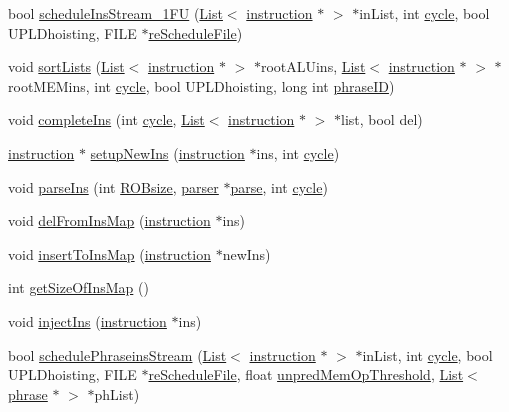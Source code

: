 \begin{DoxyCompactItemize}
\item 
bool \hyperlink{classvliwScheduler_aab01a955d85779eeeddb36cf921e8e80}{scheduleInsStream\_\-1FU} (\hyperlink{classList}{List}$<$ \hyperlink{classinstruction}{instruction} $\ast$ $>$ $\ast$inList, int \hyperlink{vliwScheduler_8cpp_a1f4871d45089b039d95d3832dd123827}{cycle}, bool UPLDhoisting, FILE $\ast$\hyperlink{bkEnd_8cpp_a0e5f51d6a6b1d82437b223b600c984c2}{reScheduleFile})
\item 
void \hyperlink{classvliwScheduler_aa7078d3900e7edcb82304e988339d33a}{sortLists} (\hyperlink{classList}{List}$<$ \hyperlink{classinstruction}{instruction} $\ast$ $>$ $\ast$rootALUins, \hyperlink{classList}{List}$<$ \hyperlink{classinstruction}{instruction} $\ast$ $>$ $\ast$rootMEMins, int \hyperlink{vliwScheduler_8cpp_a1f4871d45089b039d95d3832dd123827}{cycle}, bool UPLDhoisting, long int \hyperlink{bkEnd_8cpp_a3709ef01c299a1b84a1b023b9a44d4bc}{phraseID})
\item 
void \hyperlink{classvliwScheduler_aae6254bfac1e348447643a0dec8cbf03}{completeIns} (int \hyperlink{vliwScheduler_8cpp_a1f4871d45089b039d95d3832dd123827}{cycle}, \hyperlink{classList}{List}$<$ \hyperlink{classinstruction}{instruction} $\ast$ $>$ $\ast$list, bool del)
\item 
\hyperlink{classinstruction}{instruction} $\ast$ \hyperlink{classvliwScheduler_afd1ec0df4e12e892ef2e1d6cd5a1ad3c}{setupNewIns} (\hyperlink{classinstruction}{instruction} $\ast$ins, int \hyperlink{vliwScheduler_8cpp_a1f4871d45089b039d95d3832dd123827}{cycle})
\item 
void \hyperlink{classvliwScheduler_a9fde0b92fb06b843f278907413661df1}{parseIns} (int \hyperlink{bkEnd_8cpp_a06a6e046fd7b9a66b03d334b1df5e3ad}{ROBsize}, \hyperlink{classparser}{parser} $\ast$\hyperlink{bkEnd_8cpp_a9b8e7669bda57879d8abc5234b2f0b19}{parse}, int \hyperlink{vliwScheduler_8cpp_a1f4871d45089b039d95d3832dd123827}{cycle})
\item 
void \hyperlink{classvliwScheduler_ae3dceea059708a0c576983d42eeeb929}{delFromInsMap} (\hyperlink{classinstruction}{instruction} $\ast$ins)
\item 
void \hyperlink{classvliwScheduler_a003d398e327890ff6b77d565207f970d}{insertToInsMap} (\hyperlink{classinstruction}{instruction} $\ast$newIns)
\item 
int \hyperlink{classvliwScheduler_a730c35e836911d4e81eaccea4bee931d}{getSizeOfInsMap} ()
\item 
void \hyperlink{classvliwScheduler_adc49e9c2b4208f4bf4fe3d1a465e409b}{injectIns} (\hyperlink{classinstruction}{instruction} $\ast$ins)
\item 
bool \hyperlink{classvliwScheduler_a5abce2c71dce559d07f8f5de8f04c146}{schedulePhraseinsStream} (\hyperlink{classList}{List}$<$ \hyperlink{classinstruction}{instruction} $\ast$ $>$ $\ast$inList, int \hyperlink{vliwScheduler_8cpp_a1f4871d45089b039d95d3832dd123827}{cycle}, bool UPLDhoisting, FILE $\ast$\hyperlink{bkEnd_8cpp_a0e5f51d6a6b1d82437b223b600c984c2}{reScheduleFile}, float \hyperlink{binaryTranslator_2dot_8cpp_a88cfebd9f1e296c291bf05c5a78a6177}{unpredMemOpThreshold}, \hyperlink{classList}{List}$<$ \hyperlink{classphrase}{phrase} $\ast$ $>$ $\ast$phList)
\end{DoxyCompactItemize}


